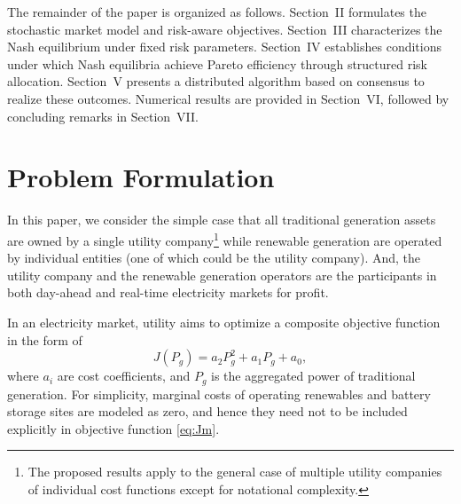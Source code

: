 \documentclass[conference]{IEEEtran}
\begin{document}
The remainder of the paper is organized as follows.
Section~II formulates the stochastic market model and risk-aware objectives.
Section~III characterizes the Nash equilibrium under fixed risk parameters.
Section~IV establishes conditions under which Nash equilibria achieve Pareto efficiency through structured risk allocation.
Section~V presents a distributed algorithm based on consensus to realize these outcomes.
Numerical results are provided in Section~VI, followed by concluding remarks in Section~VII.

\section{Problem Formulation}

In this paper, we consider the simple case that all traditional generation assets are owned by a single utility company\footnote{The proposed results apply to the general case of multiple utility companies of individual cost functions except for notational complexity.} while renewable generation are operated by individual entities (one of which could be the utility company). And, the utility company and the renewable generation operators are the participants in both day-ahead and real-time electricity markets for profit. 

In an electricity market, utility aims to optimize a composite objective function in the form of 
\begin{equation} 
J(P_g) = a_2 P_g^2 + a_1 P_g + a_0, \label{eq:Jm}
\end{equation}
where $a_i$ are cost coefficients, and $P_g$ is the aggregated power of traditional generation. For simplicity, marginal costs of operating renewables and battery storage sites are modeled as zero, and hence they need not to be included explicitly in objective function \eqref{eq:Jm}. 
\end{document}
